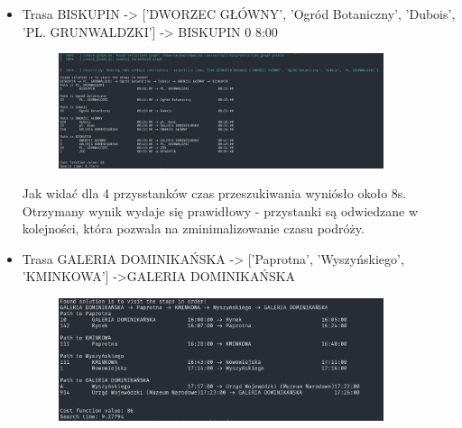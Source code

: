 \documentclass[a4paper, 12pt]{article}
\begin{document}
\begin{itemize}
    \item Trasa BISKUPIN -> ['DWORZEC GŁÓWNY', 'Ogród Botaniczny', 'Dubois', 'PL. GRUNWALDZKI'] -> BISKUPIN 0 8:00
  \begin{figure}[H]
    \centering
    \includegraphics[width=0.9\textwidth]{2024-04-08-07-36-38.png} 
  \end{figure}
  Jak widać dla 4 przysstanków czas przeszukiwania wyniósło około 8s.
  Otrzymany wynik wydaje się prawidłowy - przystanki są odwiedzane w kolejności,
  która pozwala na zminimalizowanie czasu podróży.


    \item Trasa GALERIA DOMINIKAŃSKA -> ['Paprotna', 'Wyszyńskiego', 'KMINKOWA'] ->GALERIA DOMINIKAŃSKA 
  \begin{figure}[H]
    \centering
    \includegraphics[width=0.9\textwidth]{2024-04-08-07-48-31.png} 
  \end{figure}
\end{itemize}



  
\end{document}
